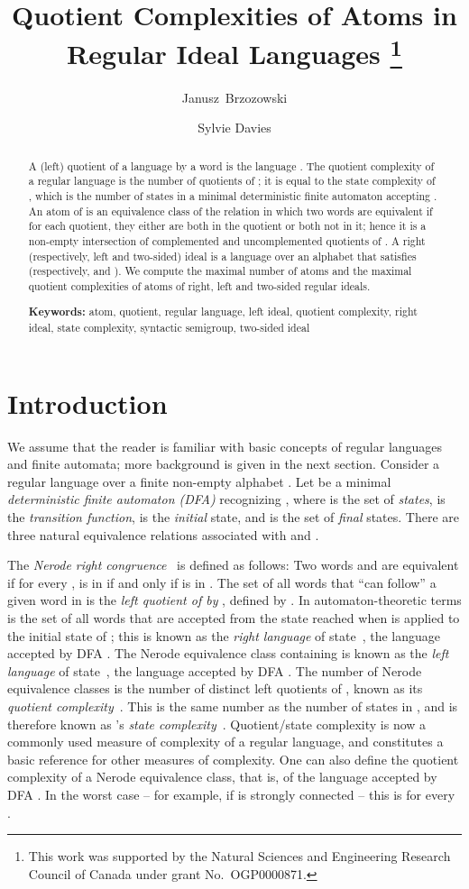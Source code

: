\documentclass{llncs}
\title{Quotient Complexities of Atoms in Regular Ideal Languages \thanks{This work was supported by the Natural Sciences and Engineering Research Council of Canada under grant No.~OGP0000871.}
}
\author{Janusz~Brzozowski\inst{1} \and Sylvie Davies\inst{2}}
\institute{David R. Cheriton School of Computer Science, University of Waterloo \\
Waterloo, ON, Canada N2L 3G1\\
{\tt brzozo@uwaterloo.ca}
\and
Department of Pure Mathematics, University of Waterloo \\
Waterloo, ON, Canada N2L 3G1\\
{\tt sldavies@uwaterloo.ca}
}
\newcommand{\noin}{\noindent}
\begin{document}
\maketitle
\begin{abstract}
A (left) quotient of a language  by a word  is the language .
The quotient complexity of a regular language  is the number of quotients of ; it is equal to the state complexity of , which is the number of states in a minimal deterministic finite automaton accepting .
An atom of   is an equivalence class of the relation in which two words are equivalent if for each quotient, they either are both in the quotient or both not in it; 
hence  it is a non-empty intersection of complemented and uncomplemented  quotients of .
A right (respectively, left and two-sided) ideal is a language  over an alphabet  that satisfies  (respectively,  and ).
We compute the maximal number of atoms and  the maximal quotient complexities of atoms of right, left and two-sided regular ideals.
\medskip


\noin
{\bf Keywords:}
atom,  quotient, regular language, left ideal, quotient complexity, right ideal, state complexity,  syntactic semigroup, two-sided ideal

\end{abstract}

\section{Introduction}

We assume that the reader is familiar with basic concepts of regular languages and finite automata; more background is given in the next section.
Consider a regular language  over a finite non-empty alphabet .
Let  be a minimal \emph{deterministic finite automaton (DFA)} recognizing , where  is the set of \emph{states},  is the \emph{transition function},  is the \emph{initial} state, and  is the set of \emph{final} states.
There are three natural equivalence relations associated with  and . 

The  \emph{Nerode right congruence}~\cite{Ner58} is defined as follows: Two words  and  are equivalent if for every ,  is in  if and only if  is in . 
The set of all words that ``can follow'' a given word  in  is the \emph{left quotient of  by }, defined by . 
In automaton-theoretic terms  is the set of all words  that are accepted from the state  reached when  is applied to the initial state of ; this is  known as the \emph{right language} of state~, the language accepted by  DFA . The Nerode equivalence class containing  is  known as the \emph{left language} of state~, the language accepted by DFA .
The number  of Nerode equivalence classes is the number of distinct left quotients of ,  known as its \emph{quotient complexity}~\cite{Brz10}. This is the same number as the number of states in , and is therefore known as 's \emph{state complexity}~\cite{Yu01}. 
Quotient/state complexity is now a commonly used measure of complexity of a regular language, and constitutes a basic reference for other measures of complexity. One can also define the quotient complexity of a Nerode equivalence class, that is, of the language accepted by  DFA . In the worst case -- for example, if  is strongly connected --  this is  for every .
\end{document}

